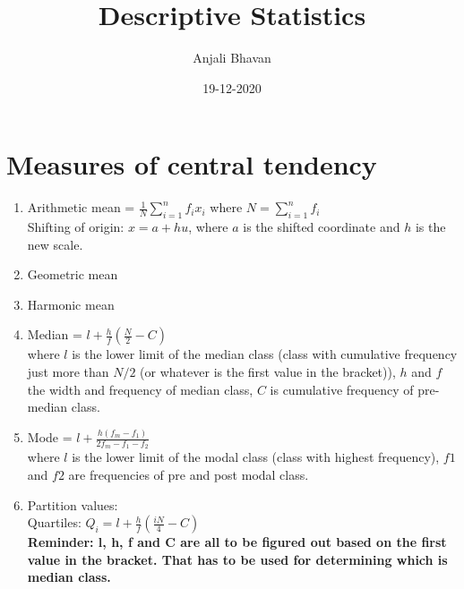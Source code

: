 \documentclass{article}
\title{Descriptive Statistics}
\date{19-12-2020}
\author{Anjali Bhavan}
\begin{document}
\maketitle
\section{Measures of central tendency}
\begin{enumerate}
    \item Arithmetic mean = $\frac{1}{N}\sum_{i = 1}^{n} f_{i}x_{i}$ 
    where $N = \sum_{i = 1}^{n} f_{i} $ \\
    Shifting of origin: $x = a + hu$, where $a$ is the shifted coordinate and $h$ is the new scale.
    \item Geometric mean 
    \item Harmonic mean
    \item Median = $l + \frac{h}{f}(\frac{N}{2}-C)$ \\
    where $l$ is the lower limit of the median class (class with cumulative frequency just more than $N/2$ (or
    whatever is the first value in the bracket)), $h$ and $f$ the width and frequency of median class,
    $C$ is cumulative frequency of pre-median class.
    \item Mode = $l + \frac{h(f_{m} - f_{1})}{2f_{m} - f_{1} - f_{2}}$ \\
    where $l$ is the lower limit of the modal class (class with highest frequency), $f1$ and $f2$ are
    frequencies of pre and post modal class.
    \item Partition values: \\
    Quartiles: $Q_{i} = l + \frac{h}{f}(\frac{iN}{4}-C)$ \\
    \textbf{Reminder: l, h, f and C are all to be figured out based on the first value in the bracket. That has to be
    used for determining which is median class.}
\end{enumerate}
\end{document}
